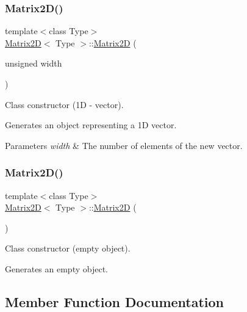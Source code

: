 \subsubsection{\texorpdfstring{Matrix2\+D()}{Matrix2D()}\hspace{0.1cm}{\footnotesize\ttfamily [2/3]}}
{\footnotesize\ttfamily template$<$class Type$>$ \\
\mbox{\hyperlink{classMatrix2D}{Matrix2D}}$<$ Type $>$\+::\mbox{\hyperlink{classMatrix2D}{Matrix2D}} (\begin{DoxyParamCaption}\item[{unsigned}]{width }\end{DoxyParamCaption})\hspace{0.3cm}{\ttfamily [inline]}}



Class constructor (1D -\/ vector). 

Generates an object representing a 1D vector. 
\begin{DoxyParams}{Parameters}
{\em width} & The number of elements of the new vector. \\
\hline
\end{DoxyParams}
\mbox{\label{classMatrix2D_a5a6653f697f1c397669bd556c1fd272a}} 
\subsubsection{\texorpdfstring{Matrix2\+D()}{Matrix2D()}\hspace{0.1cm}{\footnotesize\ttfamily [3/3]}}
{\footnotesize\ttfamily template$<$class Type$>$ \\
\mbox{\hyperlink{classMatrix2D}{Matrix2D}}$<$ Type $>$\+::\mbox{\hyperlink{classMatrix2D}{Matrix2D}} (\begin{DoxyParamCaption}{ }\end{DoxyParamCaption})\hspace{0.3cm}{\ttfamily [inline]}}



Class constructor (empty object). 

Generates an empty object. 

\subsection{Member Function Documentation}
\mbox{\label{classMatrix2D_a2845ff86d7f24ccd338b42b2a9cbe017}} 
